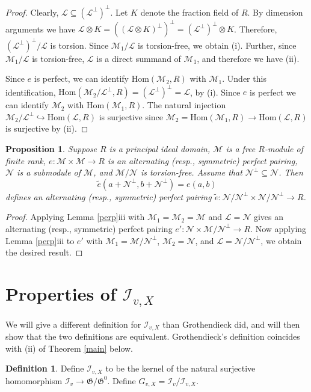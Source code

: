 \documentclass{amsart}
\def\Hom{\mathrm{Hom}}
\def\I{{\mathcal I}}
\def\II{{{\mathcal I}_{v,X}}}
\def\r{{\mathfrak G}}
\def\M{\mathcal{M}}
\def\N{\mathcal{N}}
\def\L{\mathcal{L}}
\newtheorem{prop}[thm]{Proposition}
\theoremstyle{definition}
\newtheorem{defn}[thm]{Definition}
\begin{document}
\begin{proof}
Clearly, $\L \subseteq (\L^{\perp})^{\perp}$.  
Let $K$ denote the fraction field of $R$.
By dimension arguments we have
$\L \otimes K = ((\L \otimes K)^{\perp})^{\perp} =
(\L^{\perp})^{\perp}  \otimes K$.
Therefore, $(\L^{\perp})^{\perp}/\L$ is torsion.
Since $\M_1/\L$ is torsion-free, we obtain (i).
Further, since $\M_1/\L$ is torsion-free, 
$\L$ is a direct summand of $\M_1$, and therefore we have (ii).

Since $e$ is perfect, we can identify $\Hom(\M_2,R)$ with $\M_1$.
Under this identification,
$\Hom(\M_2/\L^{\perp},R) = (\L^{\perp})^{\perp} = \L$,
by (i).  
Since $e$ is perfect we can identify $\M_2$ with $\Hom(\M_1,R)$.
The natural injection 
$\M_2/\L^{\perp} \hookrightarrow \Hom(\L,R)$ is surjective 
since $\M_2 = \Hom(\M_1,R) \to \Hom(\L,R)$ 
is surjective by (ii).
\end{proof}

\begin{prop}
\label{linalg1}
Suppose $R$ is a principal ideal domain, $\M$ is a free $R$-module
of finite rank,  $e : \M \times \M \to R$ is an alternating
(resp., symmetric) perfect
pairing, $\N$ is a submodule of $\M$, and $\M/\N$ is
torsion-free. 
Assume that $\N^{\perp} \subseteq \N$. 
Then $${\tilde e}(a+\N^{\perp},b+\N^{\perp})=e(a,b)$$
defines an alternating (resp., symmetric) perfect  
pairing
${\tilde e} : \N/\N^{\perp} \times \N/\N^{\perp} \to R$.
\end{prop}

\begin{proof}
Applying Lemma \ref{perp}iii with $\M_1 = \M_2 = \M$ and $\L = \N$ gives
an alternating (resp., symmetric) perfect pairing 
$e' : \N \times \M/\N^{\perp} \to R$.  
Now applying Lemma \ref{perp}iii to $e'$ with 
$\M_1 = \M/\N^{\perp}$, $\M_2 = \N$, and $\L = \N/\N^{\perp}$,
we obtain the desired result.
\end{proof}


\section{Properties of $\II$}
\label{properties}

We will give a different definition for $\II$  
than Grothendieck did, and will then show that the two definitions
are equivalent. Grothendieck's definition coincides with (ii) of
Theorem \ref{main} below. 

\begin{defn}
Define 
$\II$ to be the kernel of the natural surjective homomorphism
$\I_{v} \to \r/\r^{0}$. 
Define  
$G_{v,X}  = \I_{v}/\II$.
\end{defn}
\end{document}

